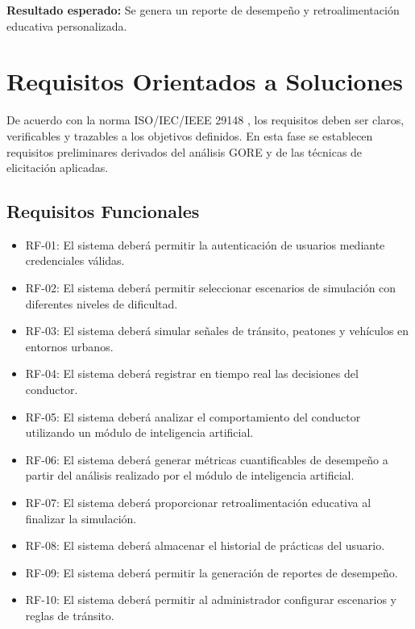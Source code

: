 \documentclass[12pt]{article}
\begin{document}
	\textbf{Resultado esperado:}  
	Se genera un reporte de desempeño y retroalimentación educativa personalizada.
	
	\section{Requisitos Orientados a Soluciones}
	
	De acuerdo con la norma ISO/IEC/IEEE 29148 \cite{ISO29148}, los requisitos deben ser claros, verificables y trazables a los objetivos definidos. En esta fase se establecen requisitos preliminares derivados del análisis GORE y de las técnicas de elicitación aplicadas.
	
	\subsection{Requisitos Funcionales}
	
	\begin{itemize}
		\item RF-01: El sistema deberá permitir la autenticación de usuarios mediante credenciales válidas.
		
		\item RF-02: El sistema deberá permitir seleccionar escenarios de simulación con diferentes niveles de dificultad.
		
		\item RF-03: El sistema deberá simular señales de tránsito, peatones y vehículos en entornos urbanos.
		
		\item RF-04: El sistema deberá registrar en tiempo real las decisiones del conductor.
		
		\item RF-05: El sistema deberá analizar el comportamiento del conductor utilizando un módulo de inteligencia artificial.
		
		\item RF-06: El sistema deberá generar métricas cuantificables de desempeño a partir del análisis realizado por el módulo de inteligencia artificial.
		
		\item RF-07: El sistema deberá proporcionar retroalimentación educativa al finalizar la simulación.
		
		\item RF-08: El sistema deberá almacenar el historial de prácticas del usuario.
		
		\item RF-09: El sistema deberá permitir la generación de reportes de desempeño.
		
		\item RF-10: El sistema deberá permitir al administrador configurar escenarios y reglas de tránsito.
	\end{itemize}
	
\end{document}
